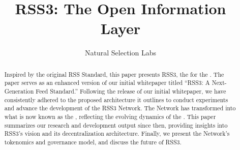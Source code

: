 \documentclass[conference]{IEEEtran}
\begin{document}
\title{RSS3: The Open Information Layer}

\author{Natural Selection Labs}
\maketitle

\tableofcontents

\thispagestyle{plain}
\pagestyle{plain}

\begin{abstract}

    Inspired by the original RSS Standard, this paper presents RSS3, the  for the . The paper serves as an enhanced version of our initial whitepaper titled ``RSS3: A Next-Generation Feed Standard.'' Following the release of our initial whitepaper, we have consistently adhered to the proposed architecture it outlines to conduct experiments and advance the development of the RSS3 Network. The Network has transformed into what is now known as the , reflecting the evolving dynamics of the . This paper summarizes our research and development output since then, providing insights into RSS3's vision and its decentralization architecture. Finally, we present the Network's tokenomics and governance model, and discuss the future of RSS3.

\end{abstract}
















\cleardoublepage

\printglossary[title=Glossary, toctitle=Glossary]
\end{document}
